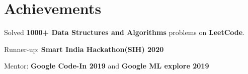 \section{Achievements}
\small{
    \resumeItemListStart
       \item {Solved \textbf{1000+ Data Structures and Algorithms} problems on \textbf{LeetCode}.}
        \item{Runner-up:} {\textbf{Smart India Hackathon(SIH) 2020}}
        \item {Mentor: \textbf{Google Code-In 2019} and \textbf{Google ML explore 2019}}
    \resumeItemListEnd
}